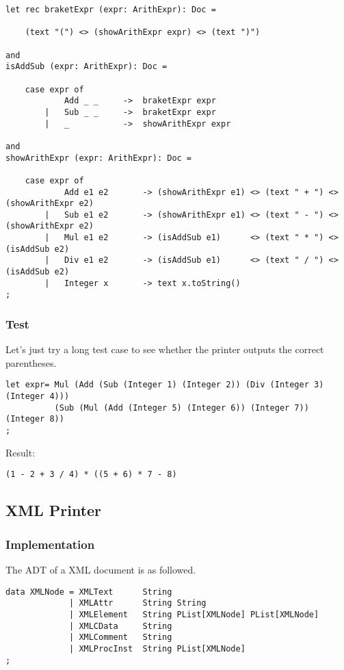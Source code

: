 \begin{lstlisting}
let rec braketExpr (expr: ArithExpr): Doc =

    (text "(") <> (showArithExpr expr) <> (text ")")

and
isAddSub (expr: ArithExpr): Doc =

    case expr of
            Add _ _     ->  braketExpr expr
        |   Sub _ _     ->  braketExpr expr
        |   _           ->  showArithExpr expr

and
showArithExpr (expr: ArithExpr): Doc =

    case expr of
            Add e1 e2       -> (showArithExpr e1) <> (text " + ") <> (showArithExpr e2)
        |   Sub e1 e2       -> (showArithExpr e1) <> (text " - ") <> (showArithExpr e2)
        |   Mul e1 e2       -> (isAddSub e1)      <> (text " * ") <> (isAddSub e2)
        |   Div e1 e2       -> (isAddSub e1)      <> (text " / ") <> (isAddSub e2)
        |   Integer x       -> text x.toString()
;
\end{lstlisting}

\subsubsection{Test}
Let's just try a long test case to see whether the printer outputs the correct parentheses.

\begin{lstlisting}
let expr= Mul (Add (Sub (Integer 1) (Integer 2)) (Div (Integer 3) (Integer 4)))
          (Sub (Mul (Add (Integer 5) (Integer 6)) (Integer 7)) (Integer 8))
;
\end{lstlisting}

Result:

\begin{lstlisting}
(1 - 2 + 3 / 4) * ((5 + 6) * 7 - 8)
\end{lstlisting}

\subsection{XML Printer}

\subsubsection{Implementation}
The ADT of a XML document is as followed.

\begin{lstlisting}
data XMLNode = XMLText      String
             | XMLAttr      String String
             | XMLElement   String PList[XMLNode] PList[XMLNode]
             | XMLCData     String
             | XMLComment   String
             | XMLProcInst  String PList[XMLNode]
;
\end{lstlisting}

